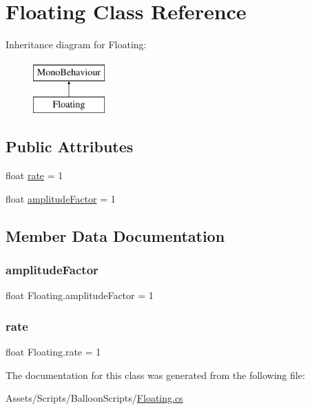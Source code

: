 \hypertarget{classFloating}{}\section{Floating Class Reference}
\label{classFloating}
Inheritance diagram for Floating\+:\begin{figure}[H]
\begin{center}
\leavevmode
\includegraphics[height=2.000000cm]{classFloating}
\end{center}
\end{figure}
\subsection*{Public Attributes}
\begin{DoxyCompactItemize}
\item 
float \hyperlink{classFloating_a28a68ac8e0d972840dc93cd84338b37a}{rate} = 1
\item 
float \hyperlink{classFloating_a4c5a4dd880bd22e019110d160ea2fa7f}{amplitude\+Factor} = 1
\end{DoxyCompactItemize}


\subsection{Member Data Documentation}
\mbox{\label{classFloating_a4c5a4dd880bd22e019110d160ea2fa7f}} 
\subsubsection{\texorpdfstring{amplitude\+Factor}{amplitudeFactor}}
{\footnotesize\ttfamily float Floating.\+amplitude\+Factor = 1}

\mbox{\label{classFloating_a28a68ac8e0d972840dc93cd84338b37a}} 
\subsubsection{\texorpdfstring{rate}{rate}}
{\footnotesize\ttfamily float Floating.\+rate = 1}



The documentation for this class was generated from the following file\+:\begin{DoxyCompactItemize}
\item 
Assets/\+Scripts/\+Balloon\+Scripts/\hyperlink{Floating_8cs}{Floating.\+cs}\end{DoxyCompactItemize}
